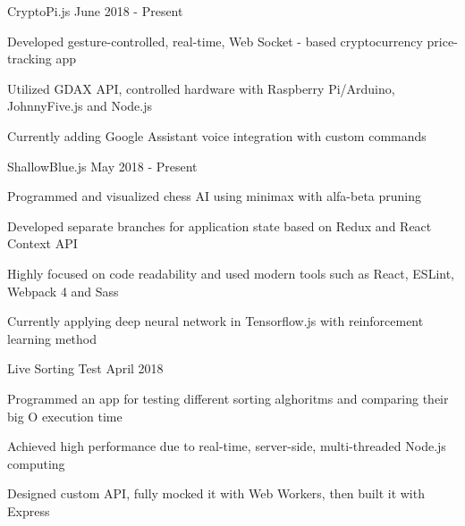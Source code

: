 
\begin{cventries}
  \cventryproject
  {CryptoPi.js} %
  {June 2018 - Present} %
    {
      \begin{cvitems} %
        \item Developed gesture-controlled, real-time, Web Socket - based cryptocurrency price-tracking app
        \item Utilized GDAX API, controlled hardware with Raspberry Pi/Arduino, JohnnyFive.js and Node.js
        \item Currently adding Google Assistant voice integration with custom commands
    \end{cvitems}
    }

    \cventryproject
    {ShallowBlue.js} %
    {May 2018 - Present} %
      {
        \begin{cvitems} %
          \item Programmed and visualized chess AI using minimax with alfa-beta pruning
          \item Developed separate branches for application state based on Redux and React Context API
          \item Highly focused on code readability and used modern tools such as React, ESLint, Webpack 4 and Sass
          \item Currently applying deep neural network in Tensorflow.js with reinforcement learning method
      \end{cvitems}
      }

      \cventryproject
      {Live Sorting Test} %
      {April 2018} %
        {
          \begin{cvitems} %
            \item Programmed an app for testing different sorting alghoritms and comparing their big O execution time
            \item Achieved high performance due to real-time, server-side, multi-threaded Node.js computing
            \item Designed custom API, fully mocked it with Web Workers, then built it with Express
        \end{cvitems}
        }


\end{cventries}
